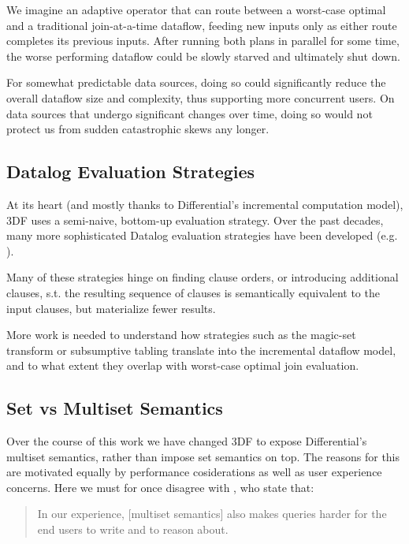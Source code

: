 \documentclass[../index.tex]{subfiles}
\begin{document}
We imagine an adaptive operator that can route between a worst-case
optimal and a traditional join-at-a-time dataflow, feeding new inputs
only as either route completes its previous inputs. After running both
plans in parallel for some time, the worse performing dataflow could
be slowly starved and ultimately shut down.

For somewhat predictable data sources, doing so could significantly
reduce the overall dataflow size and complexity, thus supporting more
concurrent users. On data sources that undergo significant changes
over time, doing so would not protect us from sudden catastrophic
skews any longer.

\subsection{Datalog Evaluation Strategies}

At its heart (and mostly thanks to Differential's incremental
computation model), 3DF uses a semi-naive, bottom-up evaluation
strategy. Over the past decades, many more sophisticated Datalog
evaluation strategies have been developed (e.g. \cite{tekle2011more}).

Many of these strategies hinge on finding clause orders, or
introducing additional clauses, s.t. the resulting sequence of clauses
is semantically equivalent to the input clauses, but materialize fewer
results.

More work is needed to understand how strategies such as the magic-set
transform or subsumptive tabling translate into the incremental
dataflow model, and to what extent they overlap with worst-case
optimal join evaluation.

\subsection{Set vs Multiset Semantics}

Over the course of this work we have changed 3DF to expose
Differential's multiset semantics, rather than impose set semantics on
top. The reasons for this are motivated equally by performance
cosiderations as well as user experience concerns. Here we must for
once disagree with \cite{aref2015design}, who state that:

\begin{quote}
  In our experience, [multiset semantics] also makes queries harder
  for the end users to write and to reason about.
\end{quote}
\end{document}
